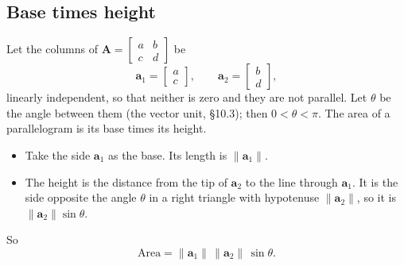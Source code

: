 \documentclass[11pt]{article}
\theoremstyle{plain}
\theoremstyle{definition}
\theoremstyle{remark}
\newcommand{\vc}[1]{\mathbf{#1}}
\newcommand{\mt}[1]{\mathbf{#1}}
\newcommand{\norm}[1]{\lVert #1\rVert}
\begin{document}
\subsection{Base times height}
Let the columns of $\mt{A}=\begin{bmatrix}a&b\\c&d\end{bmatrix}$ be
\[
  \vc{a}_1=\begin{bmatrix}a\\c\end{bmatrix},
  \qquad
  \vc{a}_2=\begin{bmatrix}b\\d\end{bmatrix},
\]
linearly independent, so that neither is zero and they are not parallel. Let
$\theta$ be the angle between them (the vector unit, \S10.3); then
$0<\theta<\pi$. The area of a parallelogram is its base times its height.
\begin{itemize}[leftmargin=1.4em,itemsep=3pt]
  \item Take the side $\vc{a}_1$ as the base. Its length is $\norm{\vc{a}_1}$.
  \item The height is the distance from the tip of $\vc{a}_2$ to the line
        through $\vc{a}_1$. It is the side opposite the angle $\theta$ in a right
        triangle with hypotenuse $\norm{\vc{a}_2}$, so it is
        $\norm{\vc{a}_2}\sin\theta$.
\end{itemize}
So
\[
  \text{Area}=\norm{\vc{a}_1}\,\norm{\vc{a}_2}\,\sin\theta .
\]

\begin{center}
\end{center}
\end{document}
